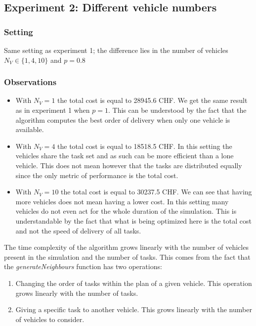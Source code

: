\documentclass[11pt]{article}
\begin{document}
\subsection{Experiment 2: Different vehicle numbers}

\subsubsection{Setting}
Same setting as experiment 1; the difference lies in the number of vehicles $N_V
\in \{1, 4, 10\}$ and $p = 0.8$

\subsubsection{Observations}
\begin{itemize}
\item With $N_V = 1$ the total cost is equal to 28945.6 CHF. We get the same
  result as in experiment 1 when $p = 1$. This can be understood by the fact
  that the algorithm computes the best order of delivery when only one vehicle
  is available.
\item With $N_V = 4$ the total cost is equal to 18518.5 CHF. In this setting the
  vehicles share the task set and as such can be more efficient than a lone
  vehicle. This does not mean however that the tasks are distributed equally
  since the only metric of performance is the total cost.
\item With $N_V = 10$ the total cost is equal to 30237.5 CHF. We can see that
  having more vehicles does not mean having a lower cost. In this setting many
  vehicles do not even act for the whole duration of the simulation. This is
  understandable by the fact that what is being optimized here is the total cost
  and not the speed of delivery of all tasks.
\end{itemize}
The time complexity of the algorithm grows linearly with the number of vehicles
present in the simulation and the number of tasks. This comes from the fact that
the \textit{generateNeighbours} function has two operations:
\begin{enumerate}
\item Changing the order of tasks within the plan of a given vehicle. This
  operation grows linearly with the number of tasks. 
\item Giving a specific task to another vehicle. This grows linearly with the
  number of vehicles to consider.
\end{enumerate}
\end{document}
